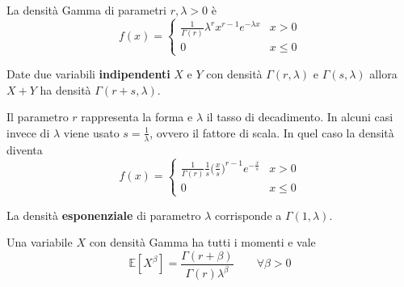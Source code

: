 \begin{definition}
	La densità Gamma di parametri $r, \lambda > 0$ è
	\begin{equation}
		f(x) = \begin{cases}
			\frac{1}{\Gamma(r)}\lambda^r x^{r-1}e^{-\lambda x} & x >0\\
			0 & x \leq 0
		\end{cases}
	\end{equation}
\end{definition}

\begin{proposition}
	Date due variabili \textbf{indipendenti} $X$ e $Y$ con densità $\Gamma(r, \lambda)$ e $\Gamma(s, \lambda)$ allora $X+Y$ ha densità $\Gamma(r+s, \lambda)$.
\end{proposition}

\begin{observation}[Parametri]
	Il parametro $r$ rappresenta la forma e $\lambda$ il tasso di decadimento. In alcuni casi invece di $\lambda$ viene usato $s=\frac{1}{\lambda}$, ovvero il fattore di scala. In quel caso la densità diventa
	\begin{equation*}
		f(x) = \begin{cases}
			\frac{1}{\Gamma(r)} \frac{1}{s} \bigg(\frac{x}{s}\bigg)^{r-1} e^{-\frac{x}{s}} & x >0\\
			0 & x \leq 0
		\end{cases}
	\end{equation*}
\end{observation}

\begin{observation}
	La densità \textbf{esponenziale} di parametro $\lambda$ corrisponde a $\Gamma(1, \lambda)$.
\end{observation}

\begin{proposition}
	Una variabile $X$ con densità Gamma ha tutti i momenti e vale
	\begin{equation}
		\mathbb{E}[X^\beta]=\frac{\Gamma(r + \beta)}{\Gamma(r)\lambda^\beta} \quad\quad \forall \beta > 0
	\end{equation}
\end{proposition}

